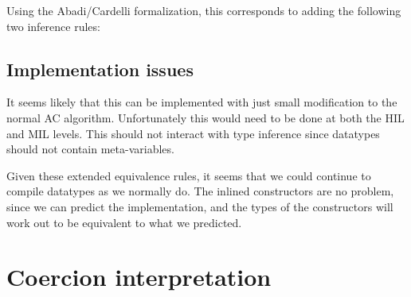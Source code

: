 \documentclass[12pt,twoside,fleqn]{article}
\begin{document}
Using the Abadi/Cardelli formalization, this corresponds to adding the
following two inference rules:

\infrule{}
{}

{}

\subsection{Implementation issues}
It seems likely that this can be implemented with just small
modification to the normal AC algorithm.  Unfortunately this would
need to be done at both the HIL and MIL levels.  This should not
interact with type inference since datatypes should not contain meta-variables.

Given these extended equivalence rules, it seems that we could
continue to compile datatypes as we normally do.  The inlined
constructors are no problem, since we can predict the implementation,
and the types of the constructors will work out to be equivalent to
what we predicted.

\section{Coercion interpretation}
\end{document}
